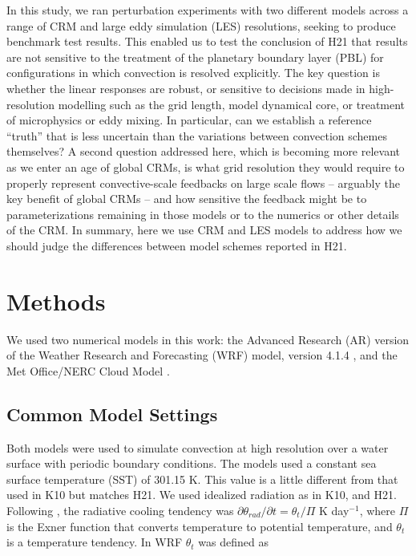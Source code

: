 \documentclass[draft]{agujournal2019}
\begin{document}
In this study, we ran perturbation experiments with two different models across
a range of CRM and large eddy simulation (LES) resolutions, seeking to produce
benchmark test results. This enabled us to test the conclusion of H21 that
results are not sensitive to the treatment of the planetary boundary layer (PBL)
for configurations in which convection is resolved explicitly. The key question
is whether the linear responses are robust, or sensitive to decisions made in
high-resolution modelling such as the grid length, model dynamical core, or
treatment of microphysics or eddy mixing. In particular, can we establish a
reference ``truth'' that is less uncertain than the variations between
convection schemes themselves? A second question addressed here, which is
becoming more relevant as we enter an age of global CRMs, is what grid
resolution they would require to properly represent convective-scale feedbacks
on large scale flows -- arguably the key benefit of global CRMs -- and how
sensitive the feedback might be to parameterizations remaining in those models
or to the numerics or other details of the CRM. In summary, here we use CRM and
LES models to address how we should judge the differences between model schemes
reported in H21.

\section{Methods}
\label{sec:methods}

We used two numerical models in this work: the Advanced Research (AR) version of
the Weather Research and Forecasting (WRF) model, version 4.1.4
\cite{Skamarock_2019}, and the Met Office/NERC Cloud Model
\cite<MONC,>{Brown_2020}.

\subsection{Common Model Settings}

Both models were used to simulate convection at high resolution over a water
surface with periodic boundary conditions. The models used a constant sea
surface temperature (SST) of 301.15 K. This value is a little different from
that used in K10 but matches H21. We used idealized radiation as in K10,
 and H21. Following , the
radiative cooling tendency was $\partial \theta_{rad} / \partial t =
\theta_t/\Pi$ K day$^{-1}$, where $\Pi$ is the Exner function that converts
temperature to potential temperature, and $\theta_t$ is a temperature tendency.
In WRF $\theta_t$ was defined as
\end{document}
